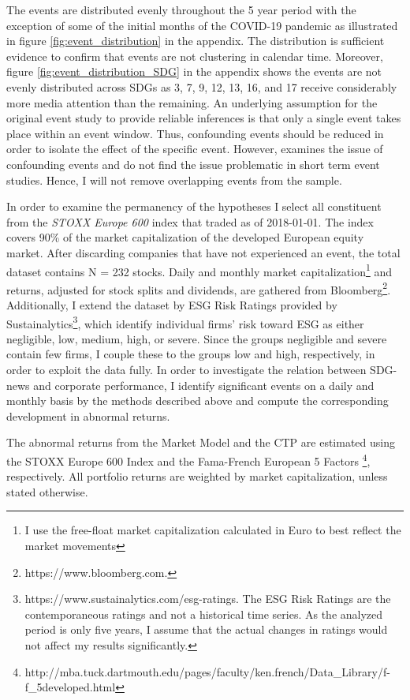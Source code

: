 The events are distributed evenly throughout the 5 year period with the exception of some of the initial months of the COVID-19 pandemic as illustrated in figure \ref{fig:event_distribution} in the appendix. The distribution is sufficient evidence to confirm that events are not clustering in calendar time. Moreover, figure \ref{fig:event_distribution_SDG} in the appendix shows the events are not evenly distributed across SDGs as 3, 7, 9, 12, 13, 16, and 17 receive considerably more media attention than the remaining. An underlying assumption for the original event study to provide reliable inferences is that only a single event takes place within an event window. Thus, confounding events should be reduced in order to isolate the effect of the specific event. However, \cite{sorescu2017event} examines the issue of confounding events and do not find the issue problematic in short term event studies. Hence, I will not remove overlapping events from the sample.  

In order to examine the permanency of the hypotheses I select all constituent from the \textit{STOXX Europe 600} index that traded as of 2018-01-01. The index covers 90\% of the market capitalization of the developed European equity market. After discarding companies that have not experienced an event, the total dataset contains N = 232 stocks. Daily and monthly market capitalization\footnote{I use the free-float market capitalization calculated in Euro to best reflect the market movements} and returns, adjusted for stock splits and dividends, are gathered from Bloomberg\footnote{https://www.bloomberg.com.}. Additionally, I extend the dataset by ESG Risk Ratings provided by Sustainalytics\footnote{https://www.sustainalytics.com/esg-ratings. The ESG Risk Ratings are the contemporaneous ratings and not a historical time series. As the analyzed period is only five years, I assume that the actual changes in ratings would not affect my results significantly.}, which identify individual firms' risk toward ESG as either negligible, low, medium, high, or severe. Since the groups negligible and severe contain few firms, I couple these to the groups low and high, respectively, in order to exploit the data fully.    
In order to investigate the relation between SDG-news and corporate performance, I identify significant events on a daily and monthly basis by the methods described above and compute the corresponding development in abnormal returns. 

The abnormal returns from the Market Model and the CTP are estimated using the STOXX Europe 600 Index and the Fama-French European 5 Factors \footnote{http://mba.tuck.dartmouth.edu/pages/faculty/ken.french/Data\_Library/f-f\_5developed.html}, respectively. All portfolio returns are weighted by market capitalization, unless stated otherwise. 

